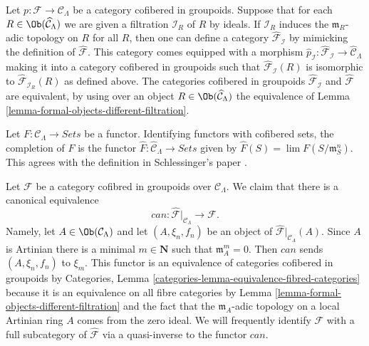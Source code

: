 \begin{remark}
\label{remark-different-sequence-ideals}
Let $p : \mathcal{F} \to \mathcal{C}_\Lambda$ be a category cofibered in
groupoids. Suppose that for each
$R \in \Ob(\widehat{\mathcal{C}}_\Lambda)$ we are given a filtration
$\mathcal{I}_R$ of $R$ by ideals. If
$\mathcal{I}_R$ induces the $\mathfrak m_R$-adic topology on $R$ for all $R$,
then one can define a category
$\widehat{\mathcal{F}}_\mathcal{I}$ by mimicking
the definition of $\widehat{\mathcal{F}}$. This category comes equipped with a
morphism
$\widehat{p}_\mathcal{I} : \widehat{\mathcal{F}}_\mathcal{I} \to
\widehat{\mathcal{C}}_\Lambda$ making it into a category cofibered in
groupoids such that $\widehat{\mathcal{F}}_\mathcal{I}(R)$ is isomorphic to
$\widehat{\mathcal{F}}_{\mathcal{I}_R}(R)$ as defined above. The categories
cofibered in groupoids $\widehat{\mathcal{F}}_\mathcal{I}$ and
$\widehat{\mathcal{F}}$ are equivalent, by using over an object
$R \in \Ob(\widehat{\mathcal{C}}_\Lambda)$
the equivalence of
Lemma \ref{lemma-formal-objects-different-filtration}.
\end{remark}

\begin{remark}
\label{remark-completion-functor}
Let $F: \mathcal{C}_\Lambda \to \textit{Sets}$ be a functor.
Identifying functors with cofibered sets, the completion of $F$ is the functor
$\widehat{F} : \widehat{\mathcal{C}}_\Lambda \to \textit{Sets}$
given by $\widehat{F}(S) = \lim F(S/\mathfrak{m}_S^{n})$.  This agrees
with the definition in Schlessinger's paper \cite{Sch}.
\end{remark}

\begin{remark}
\label{remark-restrict-completion}
Let $\mathcal{F}$ be a category cofibred in groupoids over
$\mathcal{C}_\Lambda$. We claim that there is a canonical
equivalence
$$
can :
\widehat{\mathcal{F}}|_{\mathcal{C}_\Lambda}
\longrightarrow
\mathcal{F}.
$$
Namely, let $A \in \Ob(\mathcal{C}_\Lambda)$ and let
$(A, \xi_n, f_n)$ be an object of
$\widehat{\mathcal{F}}|_{\mathcal{C}_\Lambda}(A)$.
Since $A$ is Artinian there is a minimal $m \in \mathbf{N}$
such that $\mathfrak m_A^m = 0$. Then $can$ sends $(A, \xi_n, f_n)$ to $\xi_m$.
This functor is an equivalence of categories cofibered in groupoids by
Categories, Lemma \ref{categories-lemma-equivalence-fibred-categories}
because it is an equivalence on all fibre categories by
Lemma \ref{lemma-formal-objects-different-filtration}
and the fact that the $\mathfrak m_A$-adic topology on a local
Artinian ring $A$ comes from the zero ideal. We will frequently identify
$\mathcal{F}$ with a full subcategory of $\widehat{\mathcal{F}}$ via a
quasi-inverse to the functor $can$.
\end{remark}

